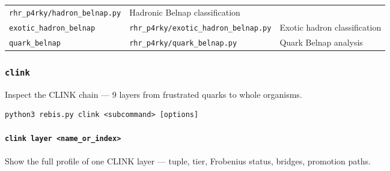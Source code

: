 \documentclass[12pt,a4paper]{article}
\begin{document}
\begin{longtable}[]{@{}lll@{}}
\begin{minipage}[t]{0.24\columnwidth}
\texttt{rhr\_p4rky/hadron\_belnap.py}\strut
\end{minipage} & \begin{minipage}[t]{0.43\columnwidth}\raggedright
Hadronic Belnap classification\strut
\end{minipage}\tabularnewline
\begin{minipage}[t]{0.24\columnwidth}\raggedright
\texttt{exotic\_hadron\_belnap}\strut
\end{minipage} & \begin{minipage}[t]{0.24\columnwidth}\raggedright
\texttt{rhr\_p4rky/exotic\_hadron\_belnap.py}\strut
\end{minipage} & \begin{minipage}[t]{0.43\columnwidth}\raggedright
Exotic hadron classification\strut
\end{minipage}\tabularnewline
\begin{minipage}[t]{0.24\columnwidth}\raggedright
\texttt{quark\_belnap}\strut
\end{minipage} & \begin{minipage}[t]{0.24\columnwidth}\raggedright
\texttt{rhr\_p4rky/quark\_belnap.py}\strut
\end{minipage} & \begin{minipage}[t]{0.43\columnwidth}\raggedright
Quark Belnap analysis\strut
\end{minipage}\tabularnewline
\bottomrule
\end{longtable}

\hypertarget{clink}{%
\subsubsection{\texorpdfstring{\texttt{clink}}{clink}}\label{clink}}

Inspect the CLINK chain --- 9 layers from frustrated quarks to whole
organisms.

\begin{verbatim}
python3 rebis.py clink <subcommand> [options]
\end{verbatim}

\hypertarget{clink-layer-name_or_index}{%
\paragraph{\texorpdfstring{\texttt{clink\ layer\ \textless{}name\_or\_index\textgreater{}}}{clink layer \textless name\_or\_index\textgreater{}}}\label{clink-layer-name_or_index}}

Show the full profile of one CLINK layer --- tuple, tier, Frobenius
status, bridges, promotion paths.
\end{document}

